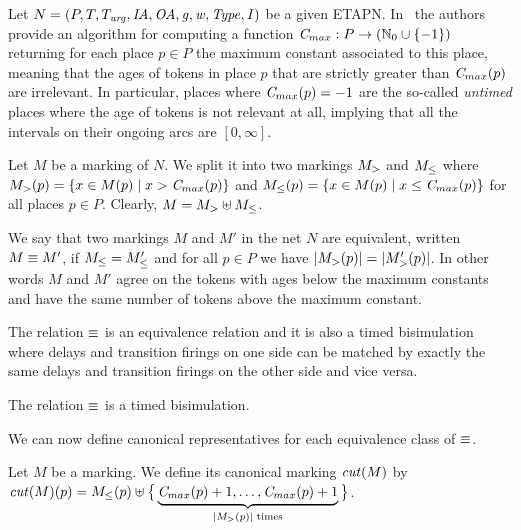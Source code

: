 Let $N=(P, T, T_{\mathit{urg}}, \mathit{IA},\allowbreak \mathit{OA}, \mathit{g}, \mathit{w}, \mathit{Type}, \mathit{I})$ be a given ETAPN.
In~\cite{ALSST:MEMICS:12} 
the authors provide an algorithm for computing 
a function $\mathit{C}_{max}: P \rightarrow (\mathbb{N}_{0} \cup \{ -1 \})$ 
returning for each place $p \in P$ the maximum constant associated
to this place, meaning that the ages of tokens in place $p$ that
are strictly greater than $\mathit{C}_{max}(p)$ are irrelevant. In particular,
places where $\mathit{C}_{max}(p)=-1$ are the so-called \emph{untimed} places
where the age of tokens is not relevant at all, implying that all
the intervals on their ongoing arcs are $[0,\infty]$.

Let $M$ be a marking of $N$. We split it into 
two markings $M_{>}$ and $M_{\leq}$ where 
$M_{>} (p)=\left\{ x\in M(p) \mid x>\mathit{C}_{max}(p) \right\}$ 
and $M_{\leq} (p)=\allowbreak\left\{ x\in M(p) \mid 
x\allowbreak\leq\allowbreak \mathit{C}_{max}(p) \right\}$
for all places $p \in P$. Clearly,
$M = M_{>} \uplus M_{\leq}$.

We say that two markings $M$ and $M'$ in the net $N$ are equivalent, 
written $M \equiv M^{\prime}$, 
if $M_{\leq}=M_{\leq}^{\prime}$
and for all $p \in P$ we have
$|M_{>} (p)|=|M_{>}^{\prime}(p)|$.
In other words $M$ and $M'$ agree on the tokens with ages below the
maximum constants and have the same number of tokens above the maximum
constant.

The relation $\equiv$ is an equivalence relation and it is
also a timed bisimulation 
where delays and transition firings on one side can be matched by
exactly the same delays and transition firings on the other side
and vice versa. %

\begin{theorem}
\label{thm:bisim}
  The relation $\equiv$ is a timed bisimulation.
\end{theorem}

We can now define canonical representatives for each
equivalence class of $\equiv$. 

\begin{definition}[Cut]
\label{def:cut}
Let $M$ be a marking.
We define its canonical marking $\mathit{cut}(M)$ by 
$\mathit{cut}(M)(p)= M_{\leq}(p)\uplus \big\{ \underbrace{ \mathit{C}_{max}(p)+1,\dots ,\mathit{C}_{max}(p)+1 }_{|M_{>}(p)| \text{ times}} \big\}$.
\end{definition}


